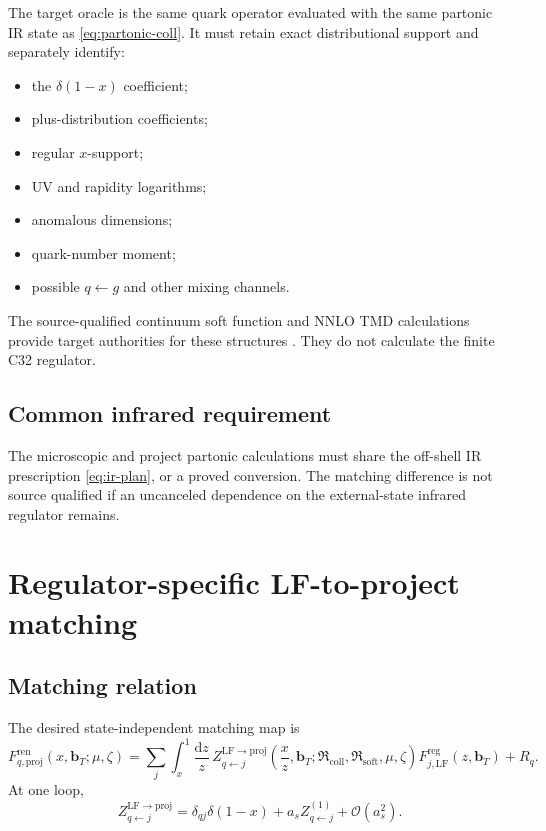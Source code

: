 \documentclass[11pt]{article}
\newcommand{\dd}{\mathrm{d}}
\newcommand{\bT}{\bm b_T}
\newcommand{\Coll}{\ensuremath{\mathrm{coll}}}
\newcommand{\Soft}{\ensuremath{\mathrm{soft}}}
\newcommand{\Proj}{\ensuremath{\mathrm{proj}}}
\newcommand{\Ren}{\ensuremath{\mathrm{ren}}}
\newcommand{\order}{\mathcal O}
\begin{document}
The target oracle is the same quark operator evaluated with the same partonic IR state as \cref{eq:partonic-coll}.  It must retain exact distributional support and separately identify:
\begin{itemize}
\item the \(\delta(1-x)\) coefficient;
\item plus-distribution coefficients;
\item regular \(x\)-support;
\item UV and rapidity logarithms;
\item anomalous dimensions;
\item quark-number moment;
\item possible \(q\leftarrow g\) and other mixing channels.
\end{itemize}
The source-qualified continuum soft function and NNLO TMD calculations provide target authorities for these structures \cite{ESVSoft2016,ESVTMD2016}.  They do not calculate the finite C32 regulator.

\subsection{Common infrared requirement}

The microscopic and project partonic calculations must share the off-shell IR prescription \eqref{eq:ir-plan}, or a proved conversion.  The matching difference is not source qualified if an uncanceled dependence on the external-state infrared regulator remains.

\section{Regulator-specific LF-to-project matching}
\label{sec:matching}

\subsection{Matching relation}

The desired state-independent matching map is
\begin{equation}
 F_{q,\Proj}^{\Ren}(x,\bT;\mu,\zeta)
 =
 \sum_j
 \int_x^1\frac{\dd z}{z}\,
 Z_{q\leftarrow j}^{\mathrm{LF}\to\Proj}
 \left(
 \frac{x}{z},\bT;
 \mathfrak R_{\Coll},
 \mathfrak R_{\Soft},
 \mu,\zeta
 \right)
 F_{j,\mathrm{LF}}^{\mathrm{reg}}(z,\bT)
 +
 R_q.
 \label{eq:lf-project-matching}
\end{equation}
At one loop,
\begin{equation}
 Z_{q\leftarrow j}^{\mathrm{LF}\to\Proj}
 =
 \delta_{qj}\delta(1-x)
 +
 a_s Z_{q\leftarrow j}^{(1)}
 +
 \order(a_s^2).
 \label{eq:matching-expansion}
\end{equation}
\end{document}
